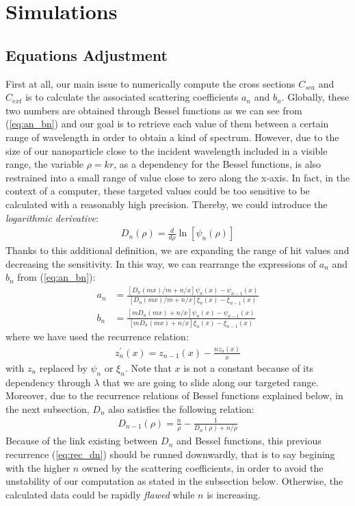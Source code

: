 \documentclass{article}
\numberwithin{equation}{section}
\begin{document}
\section{Simulations}

\subsection{Equations Adjustment}

First at all, our main issue to numerically compute the cross sections $C_{sca}$ and $C_{ext}$ is to calculate the associated scattering coefficients $a_{n}$ and $b_{n}$. Globally, these two numbers are obtained through Bessel functions as we can see from (\ref{eq:an_bn}) and our goal is to retrieve each value of them between a certain range of wavelength in order to obtain a kind of spectrum. However, due to the size of our nanoparticle close to the incident wavelength included in a visible range, the variable $\rho=kr$, as a dependency for the Bessel functions, is also restrained into a small range of value close to zero along the x-axis. In fact, in the context of a computer, these targeted values could be too sensitive to be calculated with a reasonably high precision. Thereby, we could introduce the \textit{logarithmic derivative}:
\begin{align}
D_{n}(\rho)=\frac{d}{d\rho}\ln[\psi_{n}(\rho)]
\end{align}
Thanks to this additional definition, we are expanding the range of hit values and decreasing the sensitivity. In this way, we can rearrange the expressions of $a_{n}$ and $b_{n}$ from (\ref{eq:an_bn}):
\begin{equation}
\begin{aligned}
a_{n}&=\frac{[D_{n}(mx)/m + n/x]\psi_{n}(x)-\psi_{n-1}(x)}{[D_{n}(mx)/m + n/x]\xi_{n}(x)-\xi_{n-1}(x)}\\
b_{n}&=\frac{[mD_{n}(mx) + n/x]\psi_{n}(x)-\psi_{n-1}(x)}{[mD_{n}(mx) + n/x]\xi_{n}(x)-\xi_{n-1}(x)}
\end{aligned}
\end{equation}
where we have used the recurrence relation:
\begin{align}
z^{'}_{n}(x)=z_{n-1}(x)-\frac{nz_{n}(x)}{x}
\end{align}
with $z_{n}$ replaced by $\psi_{n}$ or $\xi_{n}$. Note that $x$ is not a constant because of its dependency through $\lambda$ that we are going to slide along our targeted range. Moreover, due to the recurrence relations of Bessel functions explained below, in the next subsection, $D_{n}$ also satisfies the following relation:
\begin{align}\label{eq:rec_dn}
D_{n-1}(\rho)=\frac{n}{\rho}-\frac{1}{D_{n}(\rho)+n/\rho}
\end{align}
Because of the link existing between $D_{n}$ and Bessel functions, this previous recurrence (\ref{eq:rec_dn}) should be runned downwardly, that is to say begining with the higher $n$ owned by the scattering coefficients, in order to avoid the unstability of our computation as stated in the subsection below. Otherwise, the calculated data could be rapidly \textit{flawed} while $n$ is increasing.
\end{document}
